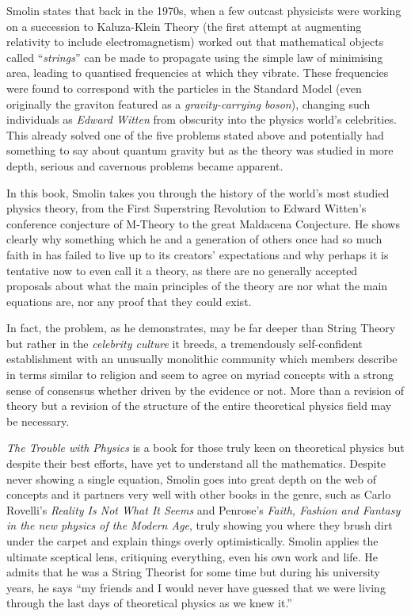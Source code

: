 \documentclass[1opt,a4paper]{article}
\begin{document}
\begin{multicols}{2}
Smolin states that back in the 1970s, when a few outcast physicists were
working on a succession to Kaluza-Klein Theory (the first attempt at
augmenting relativity to include electromagnetism) worked out that
mathematical objects called ``\emph{strings}'' can be made to propagate
using the simple law of minimising area, leading to quantised
frequencies at which they vibrate. These frequencies were found to
correspond with the particles in the Standard Model (even originally the
graviton featured as a \emph{gravity-carrying boson}), changing such
individuals as \emph{Edward Witten} from obscurity into the physics
world's celebrities. This already solved one of the five problems stated
above and potentially had something to say about quantum gravity but as
the theory was studied in more depth, serious and cavernous problems
became apparent.

In this book, Smolin takes you through the history of the world's most
studied physics theory, from the First Superstring Revolution to Edward
Witten's conference conjecture of M-Theory to the great Maldacena
Conjecture. He shows clearly why something which he and a generation of
others once had so much faith in has failed to live up to its creators'
expectations and why perhaps it is tentative now to even call it a
theory, as there are no generally accepted proposals about what the main
principles of the theory are nor what the main equations are, nor any
proof that they could exist.

In fact, the problem, as he demonstrates, may be far deeper than String
Theory but rather in the \emph{celebrity culture} it breeds, a
tremendously self-confident establishment with an unusually monolithic
community which members describe in terms similar to religion and seem
to agree on myriad concepts with a strong sense of consensus whether
driven by the evidence or not. More than a revision of theory but a
revision of the structure of the entire theoretical physics field may be
necessary.

\emph{The Trouble with Physics} is a book for those truly keen on
theoretical physics but despite their best efforts, have yet to
understand all the mathematics. Despite never showing a single equation,
Smolin goes into great depth on the web of concepts and it partners very
well with other books in the genre, such as Carlo Rovelli's
\emph{Reality Is Not What It Seems} and Penrose's \emph{Faith, Fashion
	and Fantasy in the new physics of the Modern Age}, truly showing you
where they brush dirt under the carpet and explain things overly
optimistically. Smolin applies the ultimate sceptical lens, critiquing
everything, even his own work and life. He admits that he was a String
Theorist for some time but during his university years, he says ``my
friends and I would never have guessed that we were living through the
last days of theoretical physics as we knew it.''


\end{multicols}
\end{document}
